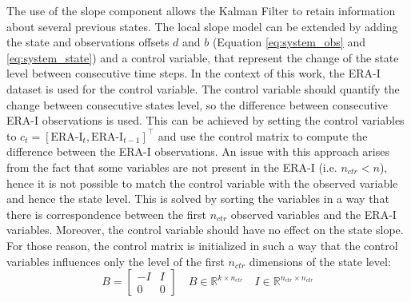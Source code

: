 \documentclass{article}
\begin{document}
The use of the slope component allows the Kalman Filter to retain information about several previous states. The local slope model can be extended by adding the state and observations offsets $d$ and $b$ (Equation \ref{eq:system_obs} and \ref{eq:system_state}) and a control variable, that represent the change of the state level between consecutive time steps.
In the context of this work, the ERA-I dataset is used for the control variable. The control variable should quantify the change between consecutive states level, so the difference between consecutive ERA-I observations is used. This can be achieved by setting the control variables to $c_t = [\text{ERA-I}_t, \text{ERA-I}_{t-1}]^\top$ and use the control matrix to compute the difference between the ERA-I observations. An issue with this approach arises from the fact that some variables are not present in the ERA-I (i.e. $n_{ctr} < n$), hence it is not possible to match the control variable with the observed variable and hence the state level. This is solved by sorting the variables in a way that there is correspondence between the first $n_{ctr}$ observed variables and the ERA-I variables. Moreover, the control variable should have no effect on the state slope. For those reason, the control matrix is initialized in such a way that the control variables influences only the level of the first $n_{ctr}$ dimensions of the state level:
\[
B = \begin{bmatrix}-I & I \\ 0 & 0\end{bmatrix} \quad B \in \mathbb{R}^{k \times n_{ctr}} \quad I \in \mathbb{R}^{n_{ctr} \times n_{ctr}}
\]







\end{document}
